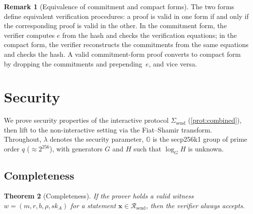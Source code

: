 \documentclass[11pt]{article}
\newtheorem{theorem}{Theorem}[section]
\theoremstyle{definition}
\newtheorem{remark}[theorem]{Remark}
\newcommand{\G}{\mathbb{G}}
\newcommand{\sk}{\mathit{sk}}
\begin{document}
\begin{remark}[Equivalence of commitment and compact forms]
  \label{rem:equivalence}
  The two forms define equivalent verification procedures:
  a proof is valid in one form if and only if the corresponding
  proof is valid in the other.
  In the commitment form, the verifier computes $e$ from the hash
  and checks the verification equations; in the compact form, the
  verifier reconstructs the commitments from the same equations and
  checks the hash.
  A valid commitment-form proof converts to compact form by
  dropping the commitments and prepending~$e$, and vice versa.
\end{remark}

\section{Security}
\label{sec:security}

We prove security properties of the interactive protocol
$\Sigma_{\mathrm{send}}$ (\cref{prot:combined}), then lift to the
non-interactive setting via the Fiat--Shamir transform.
Throughout, $\lambda$ denotes the security parameter,
$\G$ is the secp256k1 group of prime order
$q$ ($\approx 2^{256}$), with generators $G$ and $H$ such that
$\log_G H$ is unknown.

\subsection{Completeness}

\begin{theorem}[Completeness]
  \label{thm:completeness}
  If the prover holds a valid witness $w = (m, r, b, \rho, \sk_A)$
  for a statement $\mathbf{x} \in \mathcal{R}_{\mathrm{send}}$,
  then the verifier always accepts.
\end{theorem}
\end{document}
